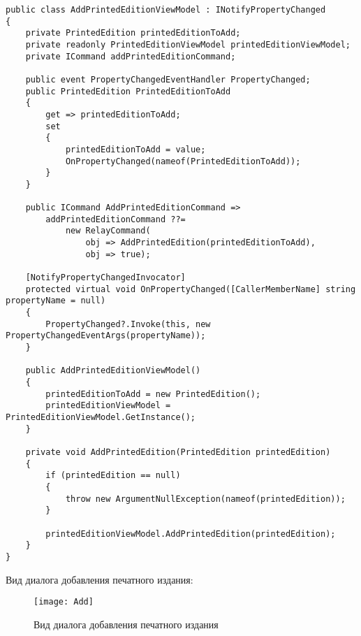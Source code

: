 \documentclass[a4paper,14pt]{extarticle}
\begin{document}
\begin{lstlisting}
public class AddPrintedEditionViewModel : INotifyPropertyChanged
{
    private PrintedEdition printedEditionToAdd;
    private readonly PrintedEditionViewModel printedEditionViewModel;
    private ICommand addPrintedEditionCommand;

    public event PropertyChangedEventHandler PropertyChanged;
    public PrintedEdition PrintedEditionToAdd
    {
        get => printedEditionToAdd;
        set
        {
            printedEditionToAdd = value;
            OnPropertyChanged(nameof(PrintedEditionToAdd));
        }
    }

    public ICommand AddPrintedEditionCommand =>
        addPrintedEditionCommand ??= 
            new RelayCommand(
                obj => AddPrintedEdition(printedEditionToAdd),
                obj => true);

    [NotifyPropertyChangedInvocator]
    protected virtual void OnPropertyChanged([CallerMemberName] string propertyName = null)
    {
        PropertyChanged?.Invoke(this, new PropertyChangedEventArgs(propertyName));
    }

    public AddPrintedEditionViewModel()
    {
        printedEditionToAdd = new PrintedEdition();
        printedEditionViewModel = PrintedEditionViewModel.GetInstance();
    }

    private void AddPrintedEdition(PrintedEdition printedEdition)
    {
        if (printedEdition == null)
        {
            throw new ArgumentNullException(nameof(printedEdition));
        }

        printedEditionViewModel.AddPrintedEdition(printedEdition);
    }
}
\end{lstlisting}

Вид диалога добавления печатного издания:
\begin{figure}[H]
    \centering
    \texttt{[image: Add]}
    \caption{Вид диалога добавления печатного издания}
    \label{fig:add}
\end{figure}
\end{document}
